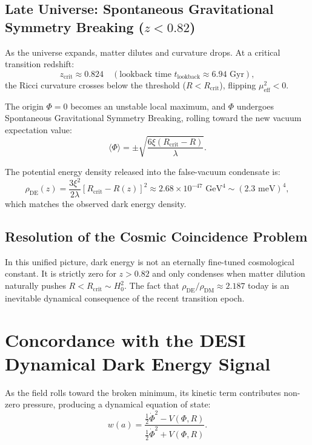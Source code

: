 \documentclass[aps,prd,twocolumn,superscriptaddress,nofootinbib,floatfix,longbibliography]{revtex4-2}
\begin{document}
\subsection{Late Universe: Spontaneous Gravitational Symmetry Breaking ($z < 0.82$)}
As the universe expands, matter dilutes and curvature drops. At a critical transition redshift:
\begin{equation}
z_{\text{crit}} \approx 0.824 \quad (\text{lookback time } t_{\text{lookback}} \approx 6.94\text{ Gyr}),
\end{equation}
the Ricci curvature crosses below the threshold ($R < R_{\text{crit}}$), flipping $\mu_{\text{eff}}^2 < 0$.

The origin $\Phi = 0$ becomes an unstable local maximum, and $\Phi$ undergoes Spontaneous Gravitational Symmetry Breaking, rolling toward the new vacuum expectation value:
\begin{equation}
\langle \Phi \rangle = \pm \sqrt{\frac{6 \xi (R_{\text{crit}} - R)}{\lambda}}.
\end{equation}

The potential energy density released into the false-vacuum condensate is:
\begin{equation}
\rho_{\text{DE}}(z) = \frac{3 \xi^2}{2 \lambda} [R_{\text{crit}} - R(z)]^2 \approx 2.68 \times 10^{-47}\text{ GeV}^4 \sim (2.3\text{ meV})^4,
\end{equation}
which matches the observed dark energy density.

\subsection{Resolution of the Cosmic Coincidence Problem}
In this unified picture, dark energy is not an eternally fine-tuned cosmological constant. It is strictly zero for $z > 0.82$ and only condenses when matter dilution naturally pushes $R < R_{\text{crit}} \sim H_0^2$. The fact that $\rho_{\text{DE}} / \rho_{\text{DM}} \approx 2.187$ today is an inevitable dynamical consequence of the recent transition epoch.

\section{Concordance with the DESI Dynamical Dark Energy Signal}
\label{sec:desi}

As the field rolls toward the broken minimum, its kinetic term contributes non-zero pressure, producing a dynamical equation of state:
\begin{equation}
w(a) = \frac{\frac{1}{2}\dot{\Phi}^2 - V(\Phi, R)}{\frac{1}{2}\dot{\Phi}^2 + V(\Phi, R)}.
\end{equation}
\end{document}
